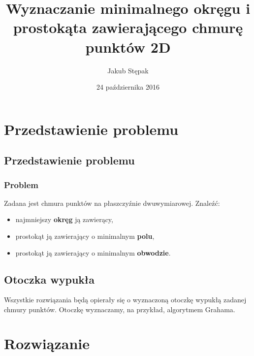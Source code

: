 \documentclass{beamer}
\title
[Minimalny okręg i prostokąt na chmurze punktów]
{Wyznaczanie minimalnego okręgu i prostokąta zawierającego chmurę punktów 2D}
\author
[Jakub Stępak]
{Jakub Stępak}
\institute
[AGH]
{
Akademia Górniczo – Hutnicza w Krakowie
}
\date{24 października 2016}
\begin{document}
\frame{\titlepage}


\section{Przedstawienie problemu}

\subsection{Przedstawienie problemu}

\begin{frame}

\frametitle{Problem}
Zadana jest chmura punktów na płaszczyźnie dwuwymiarowej.
\linebreak
\linebreak
Znaleźć:
\begin{itemize}
\item najmniejszy \textbf{okręg} ją zawierący,
\item prostokąt ją zawierający o minimalnym \textbf{polu},
\item prostokąt ją zawierający o minimalnym \textbf{obwodzie}.
\end{itemize}

\end{frame}


\subsection{Otoczka wypukła}

\begin{frame}

Wszystkie rozwiązania będą opierały się o wyznaczoną otoczkę wypukłą zadanej chmury punktów. 
\linebreak 
\linebreak
Otoczkę wyznaczamy, na przykład, algorytmem Grahama.

\end{frame}


\section{Rozwiązanie}
\end{document}
